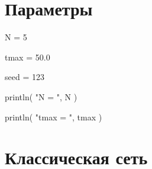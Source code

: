 \documentclass[
  english,
  russian,
  12pt,
  a4paper,
  DIV=11,
  numbers=noendperiod]{scrreprt}
\newenvironment{Shaded}{\begin{snugshade}}{\end{snugshade}}
\newcommand{\FloatTok}[1]{\textcolor[rgb]{0.68,0.00,0.00}{#1}}
\newcommand{\FunctionTok}[1]{\textcolor[rgb]{0.28,0.35,0.67}{#1}}
\newcommand{\NormalTok}[1]{\textcolor[rgb]{0.00,0.23,0.31}{#1}}
\newcommand{\OperatorTok}[1]{\textcolor[rgb]{0.37,0.37,0.37}{#1}}
\newcommand{\StringTok}[1]{\textcolor[rgb]{0.13,0.47,0.30}{#1}}
\begin{document}
\section{Параметры}\label{ux43fux430ux440ux430ux43cux435ux442ux440ux44b}

\begin{Shaded}
\begin{Highlighting}[]
\NormalTok{N }\OperatorTok{=}
    \FloatTok{5}

\NormalTok{tmax }\OperatorTok{=}
    \FloatTok{50.0}

\NormalTok{seed }\OperatorTok{=}
    \FloatTok{123}

\FunctionTok{println}\NormalTok{(}
    \StringTok{"N = "}\NormalTok{,}
\NormalTok{    N}
\NormalTok{)}

\FunctionTok{println}\NormalTok{(}
    \StringTok{"tmax = "}\NormalTok{,}
\NormalTok{    tmax}
\NormalTok{)}
\end{Highlighting}
\end{Shaded}

\section{Классическая
сеть}\label{ux43aux43bux430ux441ux441ux438ux447ux435ux441ux43aux430ux44f-ux441ux435ux442ux44c}
\end{document}
